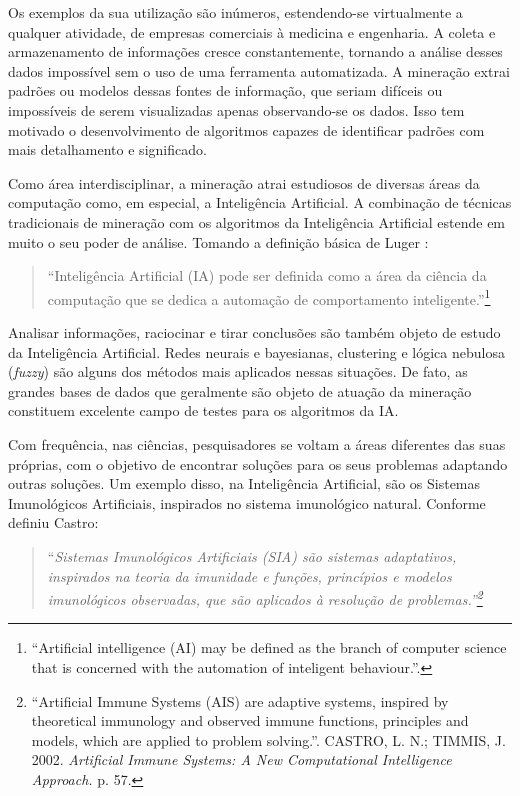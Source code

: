 Os exemplos da sua utilização são inúmeros, estendendo-se virtualmente a qualquer atividade, de empresas comerciais à medicina e engenharia. A coleta e armazenamento de informações cresce constantemente, tornando a análise desses dados impossível sem o uso de uma ferramenta automatizada. A mineração extrai padrões ou modelos dessas fontes de informação, que seriam difíceis ou impossíveis de serem visualizadas apenas observando-se os dados. Isso tem motivado o desenvolvimento de algoritmos capazes de identificar padrões com mais detalhamento e significado.

Como área interdisciplinar, a mineração atrai estudiosos de diversas áreas da computação como, em especial, a Inteligência Artificial. A combinação de técnicas tradicionais de mineração com os algoritmos da Inteligência Artificial estende em muito o seu poder de análise. Tomando a definição básica de Luger \cite[p. 1]{Luger2009}:

\begin{quote}
``Inteligência Artificial (IA) pode ser definida como a área da ciência da computação que se dedica a automação de comportamento inteligente.''\footnote{``Artificial intelligence (AI) may be defined as the branch of computer science that is concerned with the automation of inteligent behaviour.''.}
\end{quote}

Analisar informações, raciocinar e tirar conclusões são também objeto de estudo da Inteligência Artificial. Redes neurais e bayesianas, clustering e lógica nebulosa (\emph{fuzzy}) são alguns dos métodos mais aplicados nessas situações. De fato, as grandes bases de dados que geralmente são objeto de atuação da mineração constituem excelente campo de testes para os algoritmos da IA. 

Com frequência, nas ciências, pesquisadores se voltam a áreas diferentes das suas próprias, com o objetivo de encontrar soluções para os seus problemas adaptando outras soluções. Um exemplo disso, na Inteligência Artificial, são os Sistemas Imunológicos Artificiais, inspirados no sistema imunológico natural. Conforme definiu Castro:

\begin{quote}
``\emph{Sistemas Imunológicos Artificiais (SIA) são sistemas adaptativos, inspirados na teoria da imunidade e funções, princípios e modelos imunológicos observadas, que são aplicados à resolução de problemas.''\footnote{``Artificial Immune Systems (AIS) are adaptive systems, inspired by theoretical immunology and observed immune functions, principles and models, which are applied to problem solving.''. CASTRO, L. N.; TIMMIS, J. 2002. \emph{Artificial Immune Systems: A New Computational Intelligence Approach.} p. 57.}}
\end{quote}

